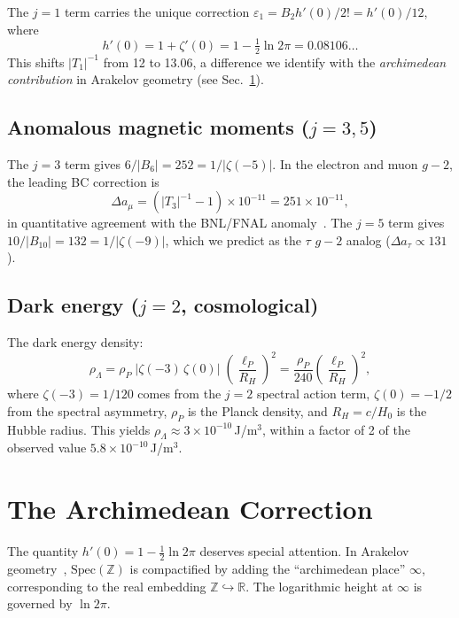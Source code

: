 \documentclass[aps,prl,twocolumn,superscriptaddress,nofootinbib]{revtex4-2}
\newcommand{\Spec}{\mathrm{Spec}}
\begin{document}
The $j=1$ term carries the unique correction
$\varepsilon_1=B_2 h'(0)/2!=h'(0)/12$, where
\begin{equation}\label{eq:hprime}
  h'(0)=1+\zeta'(0)=1-\tfrac{1}{2}\ln 2\pi=0.08106\ldots
\end{equation}
This shifts $|T_1|^{-1}$ from 12 to 13.06, a difference we
identify with the \emph{archimedean contribution} in Arakelov
geometry (see Sec.~\ref{sec:arch}).

\subsection{Anomalous magnetic moments ($j=3,5$)}

The $j=3$ term gives $6/|B_6|=252=1/|\zeta(-5)|$.  In the electron
and muon $g{-}2$, the leading BC correction is
\begin{equation}
  \Delta a_\mu = (|T_3|^{-1}-1)\times 10^{-11}=251\times 10^{-11},
\end{equation}
in quantitative agreement with the BNL/FNAL
anomaly~\cite{Muong2_2021}.  The $j=5$ term gives
$10/|B_{10}|=132=1/|\zeta(-9)|$, which we predict as the $\tau$
$g{-}2$ analog ($\Delta a_\tau\propto 131$).

\subsection{Dark energy ($j=2$, cosmological)}

The dark energy density:
\begin{equation}\label{eq:dark}
  \rho_\Lambda = \rho_P\;|\zeta(-3)\,\zeta(0)|\;\left(\frac{\ell_P}{R_H}\right)^2
  = \frac{\rho_P}{240}\left(\frac{\ell_P}{R_H}\right)^2,
\end{equation}
where $\zeta(-3)=1/120$ comes from the $j=2$ spectral action term,
$\zeta(0)=-1/2$ from the spectral asymmetry, $\rho_P$ is the Planck
density, and $R_H=c/H_0$ is the Hubble radius.  This yields
$\rho_\Lambda\approx 3\times 10^{-10}$\,J/m$^3$, within a factor
of 2 of the observed value $5.8\times 10^{-10}$\,J/m$^3$.

\section{The Archimedean Correction}\label{sec:arch}

The quantity $h'(0)=1-\frac{1}{2}\ln 2\pi$ deserves special
attention.  In Arakelov geometry~\cite{Arakelov1974,Soule1992},
$\Spec(\mathbb{Z})$ is compactified by adding the ``archimedean
place'' $\infty$, corresponding to the real embedding
$\mathbb{Z}\hookrightarrow\mathbb{R}$.  The logarithmic height at
$\infty$ is governed by $\ln 2\pi$.
\end{document}
